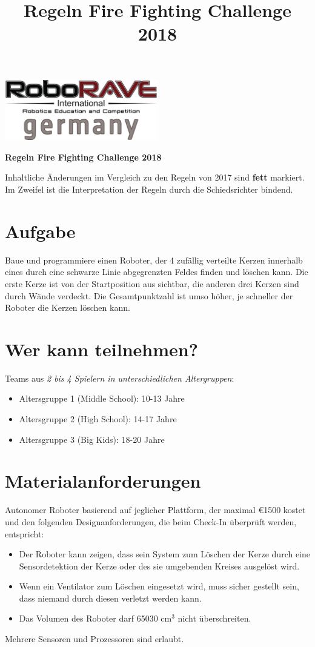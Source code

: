 \documentclass[a4paper,12pt]{article}
\begin{document}
\title{Regeln Fire Fighting Challenge 2018}

 \begin{center}
\includegraphics[width=0.5\textwidth]{logo.png}

\huge                      %
\bfseries                   %
Regeln Fire Fighting Challenge 2018
  \end{center}
  Inhaltliche Änderungen im Vergleich zu den Regeln von 2017 sind \textbf{fett} markiert. Im Zweifel ist die Interpretation der Regeln durch die Schiedsrichter bindend.
\section{Aufgabe}
Baue und programmiere einen Roboter, der 4 zufällig verteilte Kerzen innerhalb eines durch eine schwarze
Linie abgegrenzten Feldes finden und löschen kann. Die erste Kerze ist von der Startposition aus sichtbar, die
anderen drei Kerzen sind durch Wände verdeckt. Die Gesamtpunktzahl ist umso höher, je schneller der
Roboter die Kerzen löschen kann.
\section{Wer kann teilnehmen?}
Teams aus \emph{2 bis 4 Spielern in unterschiedlichen Altergruppen}:
\begin{itemize}
	\item Altersgruppe 1 (Middle School): 10-13 Jahre
	\item Altersgruppe 2 (High School): 14-17 Jahre
	\item Altersgruppe 3 (Big Kids): 18-20 Jahre
\end{itemize}
\section{Materialanforderungen}
Autonomer Roboter basierend auf jeglicher Plattform, der maximal \euro{1500} kostet und den folgenden
Designanforderungen, die beim Check-In überprüft werden, entspricht:
\begin{itemize}
\item Der Roboter kann zeigen, dass sein System zum Löschen der Kerze durch eine Sensordetektion der Kerze
oder des sie umgebenden Kreises ausgelöst wird.
\item Wenn ein Ventilator zum Löschen eingesetzt wird, muss sicher gestellt sein, dass niemand durch diesen
verletzt werden kann.
\item Das Volumen des Roboter darf 65030 cm$^{3}$ nicht überschreiten.
\end{itemize}
Mehrere Sensoren und Prozessoren sind erlaubt.
\end{document}
